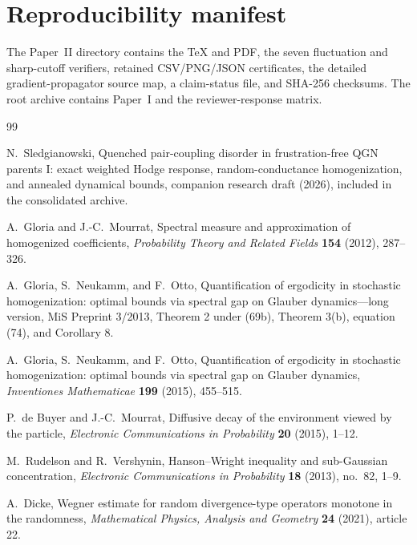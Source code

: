 \documentclass[11pt]{article}
\theoremstyle{definition}
\theoremstyle{remark}
\begin{document}
\section{Reproducibility manifest}
\label{app:manifest}

The Paper~II directory contains the TeX and PDF, the seven fluctuation and sharp-cutoff verifiers, retained CSV/PNG/JSON certificates, the detailed gradient-propagator source map, a claim-status file, and SHA-256 checksums.  The root archive contains Paper~I and the reviewer-response matrix.

\begin{thebibliography}{99}

N.~Sledgianowski,
\newblock Quenched pair-coupling disorder in frustration-free QGN parents I: exact weighted Hodge response, random-conductance homogenization, and annealed dynamical bounds,
\newblock companion research draft (2026), included in the consolidated archive.

A.~Gloria and J.-C.~Mourrat,
\newblock Spectral measure and approximation of homogenized coefficients,
\newblock \emph{Probability Theory and Related Fields} \textbf{154} (2012), 287--326.

A.~Gloria, S.~Neukamm, and F.~Otto,
\newblock Quantification of ergodicity in stochastic homogenization: optimal bounds via spectral gap on Glauber dynamics---long version,
\newblock MiS Preprint 3/2013, Theorem 2 under (69b), Theorem 3(b), equation (74), and Corollary 8.

A.~Gloria, S.~Neukamm, and F.~Otto,
\newblock Quantification of ergodicity in stochastic homogenization: optimal bounds via spectral gap on Glauber dynamics,
\newblock \emph{Inventiones Mathematicae} \textbf{199} (2015), 455--515.

P.~de Buyer and J.-C.~Mourrat,
\newblock Diffusive decay of the environment viewed by the particle,
\newblock \emph{Electronic Communications in Probability} \textbf{20} (2015), 1--12.

M.~Rudelson and R.~Vershynin,
\newblock Hanson--Wright inequality and sub-Gaussian concentration,
\newblock \emph{Electronic Communications in Probability} \textbf{18} (2013), no.~82, 1--9.

A.~Dicke,
\newblock Wegner estimate for random divergence-type operators monotone in the randomness,
\newblock \emph{Mathematical Physics, Analysis and Geometry} \textbf{24} (2021), article 22.


\end{thebibliography}
\end{document}
